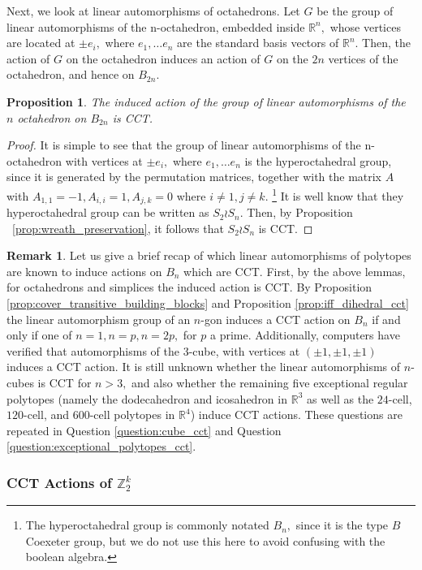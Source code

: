 \documentclass[10 pt]{amsart}
\theoremstyle{plain}
\newtheorem{prop}[thm]{Proposition}
\theoremstyle{definition}
\newtheorem{rem}[thm]{Remark}
\theoremstyle{remark}
\numberwithin{equation}{section}
\newcommand\sssec{\subsubsection}
\newcommand\BR{{\mathbb R}}
\newcommand\BZ{{\mathbb Z}}
\begin{document}
Next, we look at linear automorphisms of octahedrons. Let $G$ be the group of linear automorphisms of the n-octahedron, embedded inside $\BR^n,$ whose vertices are located at $\pm e_i,$ where $e_1,\ldots e_n$ are the standard basis vectors of $\BR^n.$ Then, the action of $G$ on the octahedron induces an action of $G$ on the $2n$ vertices of the octahedron, and hence on $B_{2n}.$

\begin{prop}
The induced action of the group of linear automorphisms of the $n$ octahedron on $B_{2n}$ is CCT.
\end{prop}
\begin{proof}
It is simple to see that the group of linear automorphisms of the n-octahedron with vertices at $\pm e_i,$ where $e_1,\ldots e_n$ is the hyperoctahedral group, since it is generated by the permutation matrices, together with the matrix $A$ with $A_{1,1} = -1,A_{i,i} = 1,A_{j,k} = 0$ where $i \neq 1, j \neq k.$ \footnote{The hyperoctahedral group is commonly notated $B_n,$ since it is the type $B$ Coexeter group, but we do not use this here to avoid confusing with the boolean algebra.} It is well know that they hyperoctahedral group can be written as $S_2 \wr S_n.$ Then, by Proposition ~\ref{prop:wreath_preservation}, it follows that $S_2 \wr S_n$ is CCT.
\end{proof}

\begin{rem}
Let us give a brief recap of which linear automorphisms of polytopes are known to induce actions on $B_n$ which are CCT. First, by the above lemmas, for octahedrons and simplices the induced action is CCT. By Proposition  \ref{prop:cover_transitive_building_blocks} and Proposition \ref{prop:iff_dihedral_cct} the linear automorphism group of an $n$-gon induces a CCT action on $B_n$ if and only if one of $n=1,n = p,n = 2p,$ for $p$ a prime. Additionally, computers have verified that automorphisms of the 3-cube, with vertices at $(\pm 1,\pm 1,\pm 1)$ induces a CCT action. It is still unknown whether the linear automorphisms of $n$-cubes is CCT for $n> 3,$ and also whether the remaining five exceptional regular polytopes (namely the dodecahedron and icosahedron in $\BR^3$ as well as the $24$-cell, $120$-cell, and $600$-cell polytopes in $\BR^4$) induce CCT actions. These questions are repeated in Question \ref{question:cube_cct} and Question \ref{question:exceptional_polytopes_cct}.
\end{rem}

\sssec{CCT Actions of $\BZ_2^k$}
\end{document}
